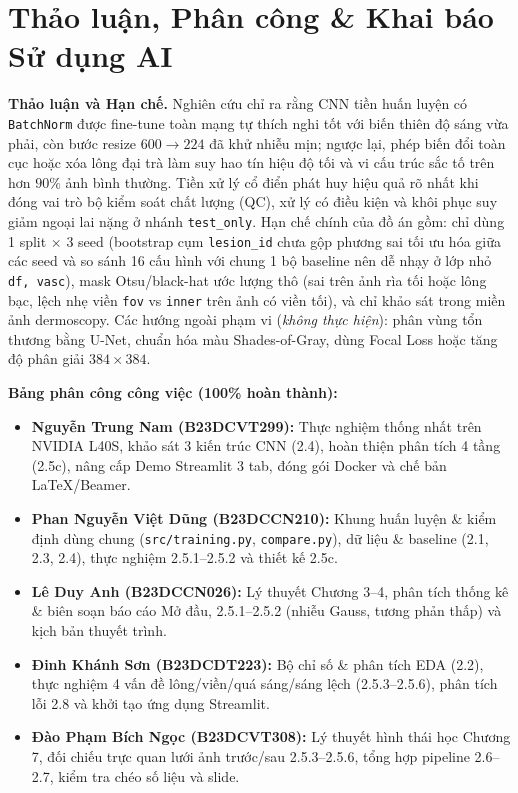\documentclass[10pt,twocolumn,a4paper]{article}
\begin{document}
\section{Thảo luận, Phân công \& Khai báo Sử dụng AI}
\textbf{Thảo luận và Hạn chế.} Nghiên cứu chỉ ra rằng CNN tiền huấn luyện có \texttt{BatchNorm} được fine-tune toàn mạng tự thích nghi tốt với biến thiên độ sáng vừa phải, còn bước resize $600{\rightarrow}224$ đã khử nhiễu mịn; ngược lại, phép biến đổi toàn cục hoặc xóa lông đại trà làm suy hao tín hiệu độ tối và vi cấu trúc sắc tố trên hơn $90\%$ ảnh bình thường. Tiền xử lý cổ điển phát huy hiệu quả rõ nhất khi đóng vai trò bộ kiểm soát chất lượng (QC), xử lý có điều kiện và khôi phục suy giảm ngoại lai nặng ở nhánh \texttt{test\_only}. Hạn chế chính của đồ án gồm: chỉ dùng 1 split $\times$ 3 seed (bootstrap cụm \texttt{lesion\_id} chưa gộp phương sai tối ưu hóa giữa các seed và so sánh 16 cấu hình với chung 1 bộ baseline nên dễ nhạy ở lớp nhỏ \texttt{df, vasc}), mask Otsu/black-hat ước lượng thô (sai trên ảnh rìa tối hoặc lông bạc, lệch nhẹ viền \texttt{fov} vs \texttt{inner} trên ảnh có viền tối), và chỉ khảo sát trong miền ảnh dermoscopy. Các hướng ngoài phạm vi (\emph{không thực hiện}): phân vùng tổn thương bằng U-Net, chuẩn hóa màu Shades-of-Gray, dùng Focal Loss hoặc tăng độ phân giải $384{\times}384$.

\textbf{Bảng phân công công việc (100\% hoàn thành):}
\begin{itemize}
    \item \textbf{Nguyễn Trung Nam (B23DCVT299):} Thực nghiệm thống nhất trên NVIDIA L40S, khảo sát 3 kiến trúc CNN (2.4), hoàn thiện phân tích 4 tầng (2.5c), nâng cấp Demo Streamlit 3 tab, đóng gói Docker và chế bản LaTeX/Beamer.
    \item \textbf{Phan Nguyễn Việt Dũng (B23DCCN210):} Khung huấn luyện \& kiểm định dùng chung (\texttt{src/training.py}, \texttt{compare.py}), dữ liệu \& baseline (2.1, 2.3, 2.4), thực nghiệm 2.5.1--2.5.2 và thiết kế 2.5c.
    \item \textbf{Lê Duy Anh (B23DCCN026):} Lý thuyết Chương 3--4, phân tích thống kê \& biên soạn báo cáo Mở đầu, 2.5.1--2.5.2 (nhiễu Gauss, tương phản thấp) và kịch bản thuyết trình.
    \item \textbf{Đinh Khánh Sơn (B23DCDT223):} Bộ chỉ số \& phân tích EDA (2.2), thực nghiệm 4 vấn đề lông/viền/quá sáng/sáng lệch (2.5.3--2.5.6), phân tích lỗi 2.8 và khởi tạo ứng dụng Streamlit.
    \item \textbf{Đào Phạm Bích Ngọc (B23DCVT308):} Lý thuyết hình thái học Chương 7, đối chiếu trực quan lưới ảnh trước/sau 2.5.3--2.5.6, tổng hợp pipeline 2.6--2.7, kiểm tra chéo số liệu và slide.
\end{itemize}
\end{document}
